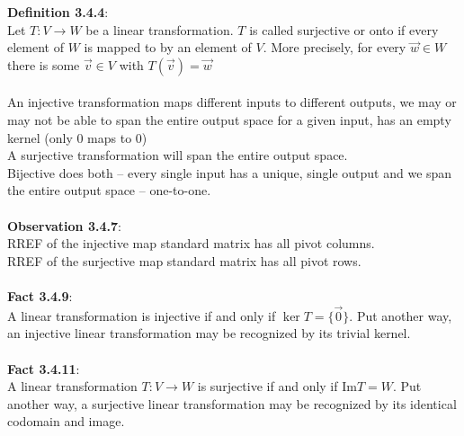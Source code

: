 \documentclass{article}
\begin{document}
\noindent \textbf{ Definition 3.4.4}:\\
Let $T: V \to W$  be a linear transformation. $T$ is called surjective or onto if every element of $W$ is mapped to by an element of $V$.   More precisely, for every $\vec{w} \in W$ there is some $\vec{v} \in V$ with $T(\vec{v})=\vec{w}$\\
\\
An injective transformation maps different inputs to different outputs, we may or may not be able to span the entire output space for a given input, has an empty kernel (only 0 maps to 0)\\
A surjective transformation will span the entire output space.\\
Bijective does both -- every single input has a unique, single output and we span the entire output space -- one-to-one.\\
\\
\noindent \textbf{ Observation 3.4.7}:\\
RREF of the injective map standard matrix has all pivot columns.\\
RREF of the surjective map standard matrix has all pivot rows.\\
\\
\noindent \textbf{Fact 3.4.9}:\\
A linear transformation is injective if and only if $\ker T = \{\vec{0}\}$. Put another way, an injective linear transformation may be recognized by its trivial kernel.\\
\\
\noindent \textbf{Fact 3.4.11}:\\
A linear transformation $T:V \rightarrow W$  is surjective if and only if $\text{Im}T = W$. Put another way, a surjective linear transformation may be recognized by its identical codomain and image.\\
\end{document}
